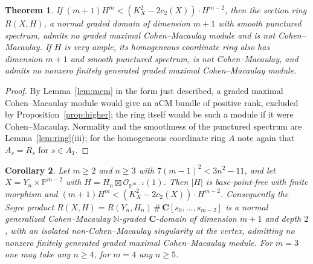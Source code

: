 \documentclass[11pt]{amsart}
\newtheorem{theorem}{Theorem}[section]
\newtheorem{corollary}[theorem]{Corollary}
\theoremstyle{remark}
\theoremstyle{definition}
\newcommand{\PP}{\mathbb{P}}
\newcommand{\NN}{\mathbb{N}}
\newcommand{\CC}{\mathbf{C}}
\newcommand{\cO}{\mathcal{O}}
\begin{document}
\begin{theorem}\label{thm:higher}
If $(m+1)H^m<(K_X^2-2c_2(X))\cdot H^{m-2}$, then the section ring $R(X,H)$, a normal graded domain of dimension $m+1$ with smooth punctured spectrum, admits no graded maximal Cohen--Macaulay module and is not Cohen--Macaulay. If $H$ is very ample, its homogeneous coordinate ring also has dimension $m+1$ and smooth punctured spectrum, is not Cohen--Macaulay, and admits no nonzero finitely generated graded maximal Cohen--Macaulay module.
\end{theorem}

\begin{proof}
By Lemma~\ref{lem:mcm} in the form just described, a graded maximal Cohen--Macaulay module would give an aCM bundle of positive rank, excluded by Proposition~\ref{prop:higher}; the ring itself would be such a module if it were Cohen--Macaulay. Normality and the smoothness of the punctured spectrum are Lemma~\ref{lem:ring}(iii); for the homogeneous coordinate ring $A$ note again that $A_s=R_s$ for $s\in A_1$.
\end{proof}

\begin{corollary}\label{cor:products}
Let $m\ge2$ and $n\ge3$ with $7(m-1)^2<3n^2-11$, and let $X=Y_n\times\PP^{m-2}$ with $H=H_n\boxtimes\cO_{\PP^{m-2}}(1)$. Then $|H|$ is base-point-free with finite morphism and $(m+1)H^m<(K_X^2-2c_2(X))\cdot H^{m-2}$. Consequently the Segre product $R(X,H)=R(Y_n,H_n)\,\#\,\CC[s_0,\dots,s_{m-2}]$ is a normal generalized Cohen--Macaulay $\NN$-graded $\CC$-domain of dimension $m+1$ and depth $2$, with an isolated non-Cohen--Macaulay singularity at the vertex, admitting no nonzero finitely generated graded maximal Cohen--Macaulay module. For $m=3$ one may take any $n\ge4$, for $m=4$ any $n\ge5$.
\end{corollary}
\end{document}
